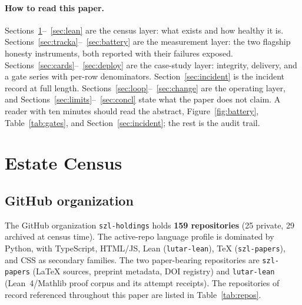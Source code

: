 \documentclass[11pt]{article}
\begin{document}
\paragraph{How to read this paper.} Sections~\ref{sec:census}--~\ref{sec:lean} are the census layer: what exists and how healthy it is. Sections~\ref{sec:tracka}--~\ref{sec:battery} are the measurement layer: the two flagship honesty instruments, both reported with their failures exposed. Sections~\ref{sec:cards}--~\ref{sec:deploy} are the case-study layer: integrity, delivery, and a gate series with per-row denominators. Section~\ref{sec:incident} is the incident record at full length. Sections~\ref{sec:loop}--~\ref{sec:change} are the operating layer, and Sections~\ref{sec:limits}--~\ref{sec:concl} state what the paper does not claim. A reader with ten minutes should read the abstract, Figure~\ref{fig:battery}, Table~\ref{tab:gates}, and Section~\ref{sec:incident}; the rest is the audit trail.

\section{Estate Census}
\label{sec:census}

\subsection{GitHub organization}
The GitHub organization \texttt{szl-holdings} holds \textbf{159 repositories} (25 private, 29 archived at census time). The active-repo language profile is dominated by Python, with TypeScript, HTML/JS, Lean (\texttt{lutar-lean}), TeX (\texttt{szl-papers}), and CSS as secondary families. The two paper-bearing repositories are \texttt{szl-papers} (LaTeX sources, preprint metadata, DOI registry) and \texttt{lutar-lean} (Lean~4/Mathlib proof corpus and its attempt receipts). The repositories of record referenced throughout this paper are listed in Table~\ref{tab:repos}.
\end{document}
